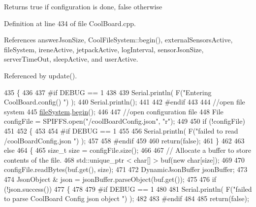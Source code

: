 \begin{DoxyReturn}{Returns}
true if configuration is done, false otherwise 
\end{DoxyReturn}


Definition at line 434 of file Cool\+Board.\+cpp.



References answer\+Json\+Size, Cool\+File\+System\+::begin(), external\+Sensors\+Active, file\+System, irene\+Active, jetpack\+Active, log\+Interval, sensor\+Json\+Size, server\+Time\+Out, sleep\+Active, and user\+Active.



Referenced by update().


\begin{DoxyCode}
435 \{
436 
437 \textcolor{preprocessor}{#if DEBUG == 1}
438 
439     Serial.println( F(\textcolor{stringliteral}{"Entering CoolBoard.config() "}) );
440     Serial.println();
441 
442 \textcolor{preprocessor}{#endif}
443 
444     \textcolor{comment}{//open file system}
445     \hyperlink{classCoolBoard_a42c2586fbb13ff7f06538e9284e8538d}{fileSystem}.\hyperlink{classCoolFileSystem_a6ba6f666ed4c530174f8569d2c636748}{begin}();
446     
447     \textcolor{comment}{//open configuration file}
448     File configFile = SPIFFS.open(\textcolor{stringliteral}{"/coolBoardConfig.json"}, \textcolor{stringliteral}{"r"});
449     
450     \textcolor{keywordflow}{if} (!configFile)
451 
452     \{
453     
454 \textcolor{preprocessor}{    #if DEBUG == 1}
455 
456         Serial.println( F(\textcolor{stringliteral}{"failed to read /coolBoardConfig.json  "}) );
457 
458 \textcolor{preprocessor}{    #endif}
459     
460         \textcolor{keywordflow}{return}(\textcolor{keyword}{false});
461     \}
462 
463     \textcolor{keywordflow}{else}
464     \{
465         \textcolor{keywordtype}{size\_t} size = configFile.size();
466 
467         \textcolor{comment}{// Allocate a buffer to store contents of the file.}
468         std::unique\_ptr < char[] > buf(\textcolor{keyword}{new} \textcolor{keywordtype}{char}[size]);
469 
470         configFile.readBytes(buf.get(), size);
471 
472         DynamicJsonBuffer jsonBuffer;
473 
474         JsonObject & json = jsonBuffer.parseObject(buf.get());
475 
476         \textcolor{keywordflow}{if} (!json.success())
477         \{
478         
479 \textcolor{preprocessor}{        #if DEBUG == 1}
480 
481             Serial.println( F(\textcolor{stringliteral}{"failed to parse CoolBoard Config json object "}) );
482     
483 \textcolor{preprocessor}{        #endif}
484 
485             \textcolor{keywordflow}{return}(\textcolor{keyword}{false});

\end{DoxyCode}
